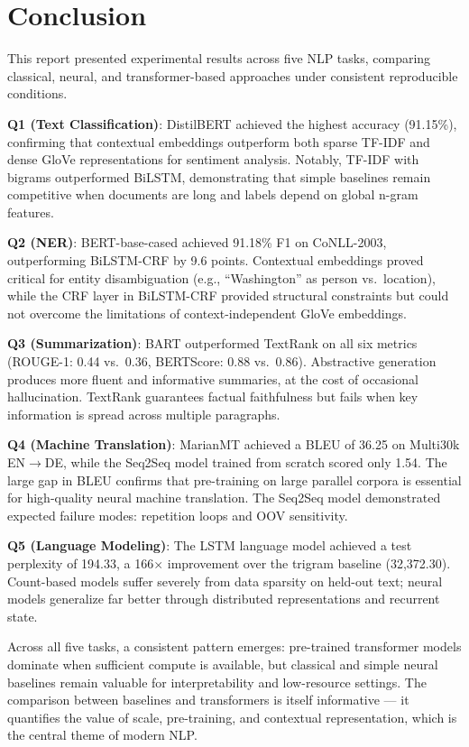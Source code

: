 \documentclass[12pt,a4paper]{article}
\begin{document}
\section{Conclusion}

This report presented experimental results across five NLP tasks, comparing classical, neural, and transformer-based approaches under consistent reproducible conditions.

\textbf{Q1 (Text Classification)}: DistilBERT achieved the highest accuracy (91.15\%), confirming that contextual embeddings outperform both sparse TF-IDF and dense GloVe representations for sentiment analysis. Notably, TF-IDF with bigrams outperformed BiLSTM, demonstrating that simple baselines remain competitive when documents are long and labels depend on global n-gram features.

\textbf{Q2 (NER)}: BERT-base-cased achieved 91.18\% F1 on CoNLL-2003, outperforming BiLSTM-CRF by 9.6 points. Contextual embeddings proved critical for entity disambiguation (e.g., ``Washington'' as person vs.\ location), while the CRF layer in BiLSTM-CRF provided structural constraints but could not overcome the limitations of context-independent GloVe embeddings.

\textbf{Q3 (Summarization)}: BART outperformed TextRank on all six metrics (ROUGE-1: 0.44 vs.\ 0.36, BERTScore: 0.88 vs.\ 0.86). Abstractive generation produces more fluent and informative summaries, at the cost of occasional hallucination. TextRank guarantees factual faithfulness but fails when key information is spread across multiple paragraphs.

\textbf{Q4 (Machine Translation)}: MarianMT achieved a BLEU of 36.25 on Multi30k EN$\rightarrow$DE, while the Seq2Seq model trained from scratch scored only 1.54. The large gap in BLEU confirms that pre-training on large parallel corpora is essential for high-quality neural machine translation. The Seq2Seq model demonstrated expected failure modes: repetition loops and OOV sensitivity.

\textbf{Q5 (Language Modeling)}: The LSTM language model achieved a test perplexity of 194.33, a 166$\times$ improvement over the trigram baseline (32{,}372.30). Count-based models suffer severely from data sparsity on held-out text; neural models generalize far better through distributed representations and recurrent state.

Across all five tasks, a consistent pattern emerges: pre-trained transformer models dominate when sufficient compute is available, but classical and simple neural baselines remain valuable for interpretability and low-resource settings. The comparison between baselines and transformers is itself informative — it quantifies the value of scale, pre-training, and contextual representation, which is the central theme of modern NLP.
\end{document}

